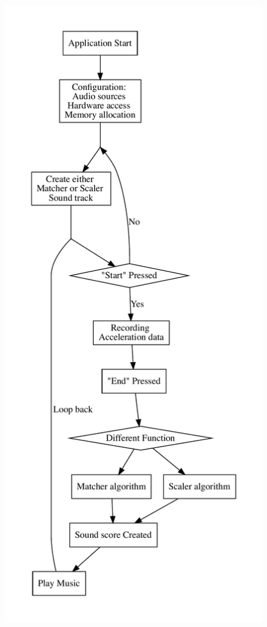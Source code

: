 \begin{figure}[H]

\begin{minipage}[b]{0.5\linewidth}
\centering
\includegraphics[height=0.95\textheight]{figWR/a}

\end{minipage}
\end{figure}
